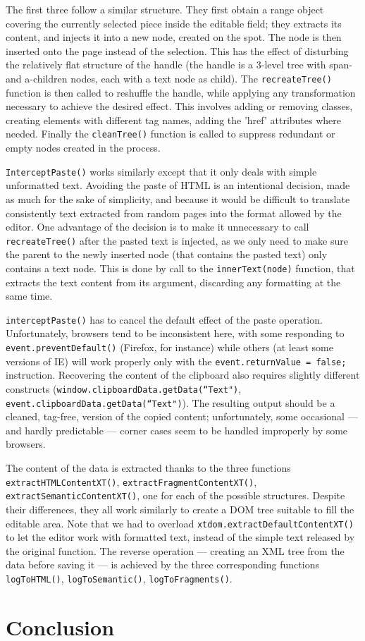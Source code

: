 \documentclass[11pt,a4paper]{article}
\begin{document}
The first three follow a similar structure. They first obtain a range object covering the currently selected piece inside the editable field; they extracts its content, and injects it into a new node, created on the spot. The node is then inserted onto the page instead of the selection. This has the effect of disturbing the relatively flat structure of the handle (the handle is a 3-level tree with span- and a-children nodes, each with a text node as child). The \texttt{recreateTree()} function is then called to reshuffle the handle, while applying any transformation necessary to achieve the desired effect. This involves adding or removing classes, creating elements with different tag names, adding the 'href' attributes where needed. Finally the \texttt{cleanTree()} function is called to suppress redundant or empty nodes created in the process.

\texttt{InterceptPaste()} works similarly except that it only deals with simple unformatted text. Avoiding the paste of HTML is an intentional decision, made as much for the sake of simplicity, and because it would be difficult to translate consistently text extracted from random pages into the format allowed by the editor. One advantage of the decision is to make it unnecessary to call \texttt{recreateTree()} after the pasted text is injected, as we only need to make sure the parent to the newly inserted node (that contains the pasted text) only contains a text node. This is done by call to the \texttt{innerText(node)} function, that extracts the text content from its argument, discarding any formatting at the same time. 

\texttt{interceptPaste()} has to cancel the default effect of the paste operation. Unfortunately, browsers tend to be inconsistent here, with some responding to \verb?event.preventDefault()? (Firefox, for instance) while others (at least some versions of IE) will work properly only with the \verb?event.returnValue = false;? instruction. Recovering the content of the clipboard also requires slightly different constructs (\texttt{window.clipboardData.getData(``Text")}, \texttt{event.clipboardData.getData(``Text")}). The resulting output should be a cleaned, tag-free, version of the copied content; unfortunately, some occasional --- and hardly predictable --- corner cases seem to be handled improperly by some browsers.

The content of the data is extracted thanks to the three functions \texttt{extractHTMLContentXT()}, \texttt{extractFragmentContentXT()}, \texttt{extractSemanticContentXT()}, one for each of the possible structures. Despite their differences, they all work similarly to create a DOM tree suitable to fill the editable area. Note that we had to overload \texttt{xtdom.extractDefaultContentXT()} to let the editor work with formatted text, instead of the simple text released by the original function. The reverse operation --- creating an XML tree from the data before saving it --- is achieved by the three corresponding functions \texttt{logToHTML()}, \texttt{logToSemantic()}, \texttt{logToFragments()}.


\section{Conclusion}
\end{document}

